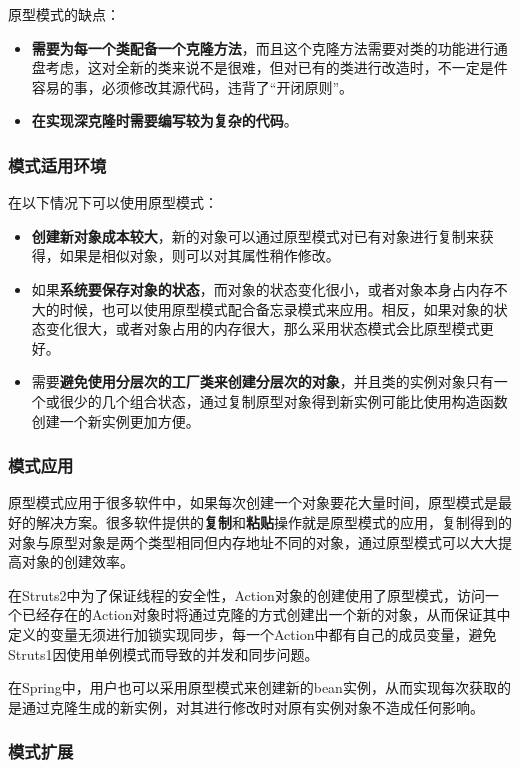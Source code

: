 原型模式的缺点：
\begin{itemize}
    \item \textbf{需要为每一个类配备一个克隆方法}，而且这个克隆方法需要对类的功能进行通盘考虑，这对全新的类来说不是很难，但对已有的类进行改造时，不一定是件容易的事，必须修改其源代码，违背了“开闭原则”。
    \item \textbf{在实现深克隆时需要编写较为复杂的代码}。
\end{itemize}

\subsubsection{模式适用环境}
在以下情况下可以使用原型模式：
\begin{itemize}
    \item \textbf{创建新对象成本较大}，新的对象可以通过原型模式对已有对象进行复制来获得，如果是相似对象，则可以对其属性稍作修改。
    \item 如果\textbf{系统要保存对象的状态}，而对象的状态变化很小，或者对象本身占内存不大的时候，也可以使用原型模式配合备忘录模式来应用。相反，如果对象的状态变化很大，或者对象占用的内存很大，那么采用状态模式会比原型模式更好。
    \item 需要\textbf{避免使用分层次的工厂类来创建分层次的对象}，并且类的实例对象只有一个或很少的几个组合状态，通过复制原型对象得到新实例可能比使用构造函数创建一个新实例更加方便。
\end{itemize}

\subsubsection{模式应用}
 原型模式应用于很多软件中，如果每次创建一个对象要花大量时间，原型模式是最好的解决方案。很多软件提供的\textbf{复制}和\textbf{粘贴}操作就是原型模式的应用，复制得到的对象与原型对象是两个类型相同但内存地址不同的对象，通过原型模式可以大大提高对象的创建效率。

 在Struts2中为了保证线程的安全性，Action对象的创建使用了原型模式，访问一个已经存在的Action对象时将通过克隆的方式创建出一个新的对象，从而保证其中定义的变量无须进行加锁实现同步，每一个Action中都有自己的成员变量，避免Struts1因使用单例模式而导致的并发和同步问题。

 在Spring中，用户也可以采用原型模式来创建新的bean实例，从而实现每次获取的是通过克隆生成的新实例，对其进行修改时对原有实例对象不造成任何影响。

\subsubsection{模式扩展}


